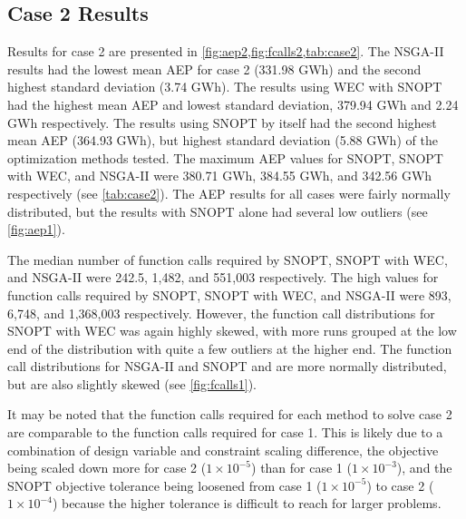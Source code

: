 \documentclass[a4paper]{jpconf}
\begin{document}
\subsection{Case 2 Results}

Results for case 2 are presented in \cref{fig:aep2,fig:fcalls2,tab:case2}. The NSGA-II results had the lowest mean AEP for case 2 (331.98 GWh) and the second highest standard deviation (3.74 GWh). The results using WEC with SNOPT had the highest mean AEP and lowest standard deviation, 379.94 GWh and 2.24 GWh respectively. The results using SNOPT by itself had the second highest mean AEP (364.93 GWh), but highest standard deviation (5.88 GWh) of the optimization methods tested. The maximum AEP values for SNOPT, SNOPT with WEC, and NSGA-II were 380.71 GWh, 384.55 GWh, and 342.56 GWh respectively (see \cref{tab:case2}). The AEP results for all cases were fairly normally distributed, but the results with SNOPT alone had several low outliers (see \cref{fig:aep1}).

 The median number of function calls required by SNOPT, SNOPT with WEC, and NSGA-II were 242.5, 1,482, and 551,003 respectively. The high values for function calls required by SNOPT, SNOPT with WEC, and NSGA-II were 893, 6,748, and 1,368,003 respectively. However, the function call distributions for SNOPT with WEC was again highly skewed, with more runs grouped at the low end of the distribution with quite a few outliers at the higher end. The function call distributions for NSGA-II and SNOPT and are more normally distributed, but are also slightly skewed (see \cref{fig:fcalls1}).

It may be noted that the function calls required for each method to solve case 2 are comparable to the function calls required for case 1. This is likely due to a combination of design variable and constraint scaling difference, the objective being scaled down more for case 2 ($1\times10^{-5}$) than for case 1 ($1\times10^{-3}$), and the SNOPT objective tolerance being loosened from case 1 ($1\times10^{-5}$) to case 2 ($1\times10^{-4}$) because the higher tolerance is difficult to reach for larger problems.
\end{document}
